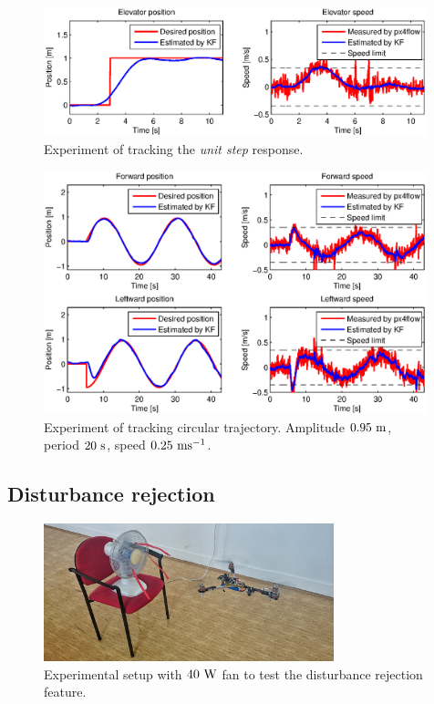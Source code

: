 \begin{figure}[h]
\centering
\includegraphics[width=0.99\textwidth]{fig/experiment2_step.eps}
\caption{Experiment of tracking the \emph{unit step} response.}
\label{fig:experiment_step}
\end{figure}

\begin{figure}[H]
\centering
\includegraphics[width=0.99\textwidth]{fig/experiment1_sine.eps}
\caption{Experiment of tracking circular trajectory. Amplitude $0.95~\mathrm{m}$, period $20~\mathrm{s}$, speed $0.25~\mathrm{ms^{-1}}$.}
\label{fig:experiment_sine_1}
\end{figure}

\subsection{Disturbance rejection}

\begin{figure}[b]
\centering
\includegraphics[width=0.75\textwidth]{fig/disturbance.jpg}
\caption{Experimental setup with $40~\mathrm{W}$ fan to test the disturbance rejection feature.}
\label{fig:vetrak1}
\end{figure}

